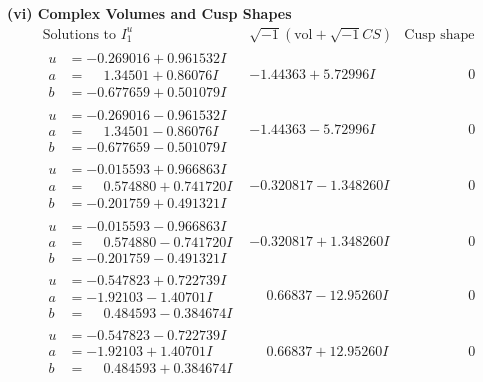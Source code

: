 \documentclass[1p]{elsarticle_modified}
\theoremstyle{definition}
\newcommand{\I}{\sqrt{-1}}
\begin{document}
\newpage\flushleft \textbf{(vi) Complex Volumes and Cusp Shapes}
$$\begin{array}{c|c|c}  
\text{Solutions to }I^u_{1}& \I (\text{vol} + \sqrt{-1}CS) & \text{Cusp shape}\\
 \hline 
\begin{aligned}
u &= -0.269016 + 0.961532 I \\
a &= \phantom{-}1.34501 + 0.86076 I \\
b &= -0.677659 + 0.501079 I\end{aligned}
 & -1.44363 + 5.72996 I & \phantom{-0.000000 } 0 \\ \hline\begin{aligned}
u &= -0.269016 - 0.961532 I \\
a &= \phantom{-}1.34501 - 0.86076 I \\
b &= -0.677659 - 0.501079 I\end{aligned}
 & -1.44363 - 5.72996 I & \phantom{-0.000000 } 0 \\ \hline\begin{aligned}
u &= -0.015593 + 0.966863 I \\
a &= \phantom{-}0.574880 + 0.741720 I \\
b &= -0.201759 + 0.491321 I\end{aligned}
 & -0.320817 - 1.348260 I & \phantom{-0.000000 } 0 \\ \hline\begin{aligned}
u &= -0.015593 - 0.966863 I \\
a &= \phantom{-}0.574880 - 0.741720 I \\
b &= -0.201759 - 0.491321 I\end{aligned}
 & -0.320817 + 1.348260 I & \phantom{-0.000000 } 0 \\ \hline\begin{aligned}
u &= -0.547823 + 0.722739 I \\
a &= -1.92103 - 1.40701 I \\
b &= \phantom{-}0.484593 - 0.384674 I\end{aligned}
 & \phantom{-}0.66837 - 12.95260 I & \phantom{-0.000000 } 0 \\ \hline\begin{aligned}
u &= -0.547823 - 0.722739 I \\
a &= -1.92103 + 1.40701 I \\
b &= \phantom{-}0.484593 + 0.384674 I\end{aligned}
 & \phantom{-}0.66837 + 12.95260 I & \phantom{-0.000000 } 0 \\ \hline\begin{aligned}

\end{aligned}
\end{array}$$
\end{document}
